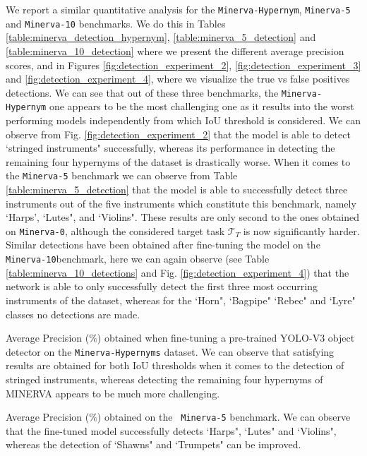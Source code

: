 We report a similar quantitative analysis for the \texttt{Minerva-Hypernym}, \texttt{Minerva-5} and \texttt{Minerva-10} benchmarks. We do this in Tables \ref{table:minerva_detection_hypernym}, \ref{table:minerva_5_detection} and \ref{table:minerva_10_detection} where we present the different average precision scores, and in Figures \ref{fig:detection_experiment_2}, \ref{fig:detection_experiment_3} and \ref{fig:detection_experiment_4}, where we visualize the true vs false positives detections. We can see that out of these three benchmarks, the \texttt{Minerva-Hypernym} one appears to be the most challenging one as it results into the worst performing models independently from which IoU threshold is considered. We can observe from Fig. \ref{fig:detection_experiment_2} that the model is able to detect `stringed instruments" successfully, whereas its performance in detecting the remaining four hypernyms of the dataset is drastically worse. When it comes to the \texttt{Minerva-5} benchmark we can observe from Table \ref{table:minerva_5_detection} that the model is able to successfully detect three instruments out of the five instruments which constitute this benchmark, namely `Harps', `Lutes", and `Violins". These results are only second to the ones obtained on \texttt{Minerva-0}, although the considered target task $\mathcal{T}_T$ is now significantly harder. Similar detections have been obtained after fine-tuning the model on the \texttt{Minerva-10}benchmark, here we can again observe (see Table \ref{table:minerva_10_detections} and Fig. \ref{fig:detection_experiment_4}) that the network is able to only successfully detect the first three most occurring instruments of the dataset, whereas for the `Horn", `Bagpipe" `Rebec" and `Lyre" classes no detections are made. 

\begin{table}
	\caption{Average Precision ($\%$) obtained when fine-tuning a pre-trained YOLO-V3 object detector on the \texttt{Minerva-Hypernyms} dataset. We can observe that satisfying results are obtained for both IoU thresholds when it comes to the detection of stringed instruments, whereas detecting the remaining four hypernyms of MINERVA appears to be much more challenging.}
\resizebox{\columnwidth}{!}{%
}
\label{table:minerva_detection_hypernyms}
\end{table}


\begin{table}
	\caption{Average Precision ($\%$) obtained on the \texttt{ Minerva-5} benchmark. We can observe that the fine-tuned model successfully detects `Harps", `Lutes" and `Violins", whereas the detection of `Shawns" and `Trumpets" can be improved.}
\resizebox{\columnwidth}{!}{%
}
\label{table:minerva_5_detection}
\end{table}


